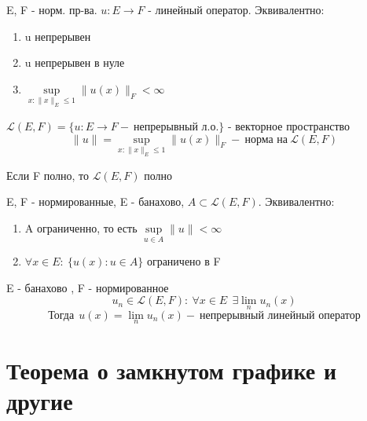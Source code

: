 \documentclass[a4paper,12pt]{article}
\begin{document}
\begin{claim*}
E, F - норм. пр-ва. $u : E \to F$ - линейный оператор. Эквивалентно:
\begin{enumerate}
    \item u непрерывен
    \item u непрерывен в нуле
    \item $\sup\limits_{x : \|x\|_E \le 1} \|u(x)\|_F < \infty$
\end{enumerate}
\end{claim*}

\begin{corollary*}
$\mathcal{L}(E, F) = \{u:E \to F - \ \text{непрерывный л.о.} \}$ - векторное пространство
\[
\|u\| = \sup\limits_{x : \|x\|_E \le 1} \|u(x)\|_F - \ \text{норма на} \ \mathcal{L}(E, F)
\]
\end{corollary*}

\begin{claim*}
Если F полно, то $\mathcal{L}(E, F)$ полно
\end{claim*}

\begin{theorem*}
E, F - нормированные, E - банахово, $A \subset \mathcal{L}(E, F)$. Эквивалентно:
\begin{enumerate}
    \item A ограниченно, то есть $\sup\limits_{u \in A} \|u\| < \infty$
    \item $\forall x \in E : \ \{ u(x) : u \in A \}$ ограничено в F
\end{enumerate}
\end{theorem*}

\begin{corollary*}
E - банахово , F - нормированное
$$u_n \in \mathcal{L}(E, F) : \ \forall x \in E \ \ \exists \lim\limits_{n} u_n(x)$$
$$\text{Тогда} \ \ u(x) = \lim\limits_{n} u_n(x) - \ \text{непрерывный линейный оператор}$$
\end{corollary*}














\vspace{2cm}

\section{Теорема о замкнутом графике и другие}
\end{document}
